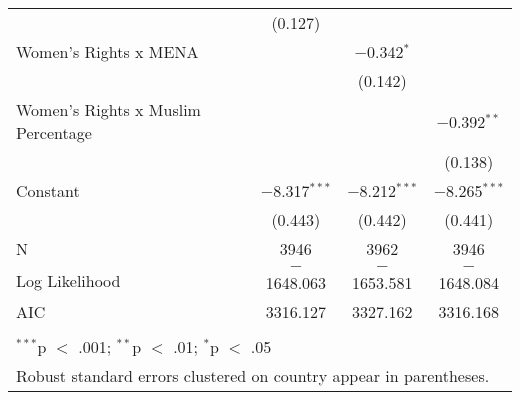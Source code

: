 \begin{table}[!htbp]
\begin{tabular}{@{\extracolsep{5pt}}lccc}
  & (0.127) &  &  \\ 
  Women's Rights x MENA &  & $-$0.342$^{*}$ &  \\ 
  &  & (0.142) &  \\ 
  Women's Rights x Muslim Percentage &  &  & $-$0.392$^{**}$ \\ 
  &  &  & (0.138) \\ 
  Constant & $-$8.317$^{***}$ & $-$8.212$^{***}$ & $-$8.265$^{***}$ \\ 
  & (0.443) & (0.442) & (0.441) \\ 
 N & 3946 & 3962 & 3946 \\ 
Log Likelihood & $-$1648.063 & $-$1653.581 & $-$1648.084 \\ 
AIC & 3316.127 & 3327.162 & 3316.168 \\ 
\hline \\[-1.8ex] 
\multicolumn{4}{l}{$^{***}$p $<$ .001; $^{**}$p $<$ .01; $^{*}$p $<$ .05} \\ 
\multicolumn{4}{l}{Robust standard errors clustered on country appear in parentheses.} \\ 
\end{tabular} 
\end{table} 
